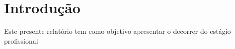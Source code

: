 \chapter{Introdução}
\label{intro}

Este presente relatório tem como objetivo apresentar o decorrer do estágio profissional 
